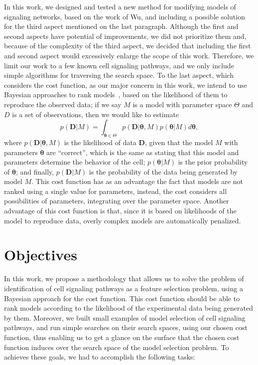 In this work, we designed and tested a new method for modifying 
models of signaling networks, based on the work of Wu, and including 
a possible solution for the third aspect mentioned on the last 
paragraph. Although the first and second aspects have potential of 
improvements, we did not prioritize them and, because of the 
complexity of the third aspect, we decided that including the first and 
second aspect would excessively enlarge the scope of this work.
Therefore, we limit our work to a few known cell signaling pathways, and
we only include simple algorithms for traversing the search space. To
the last aspect, which considers the cost function, as our major 
concern in this work, we intend to use Bayesian approaches to rank 
models~\cite{Vyshemirsky2007}, based on the likelihood of them to 
reproduce the observed data; if we say $M$ is a model with parameter 
space $\Theta$ and $D$ is a set of observations, then we would like to 
estimate 
\begin{equation*}
    p ({\bm D}|M) = \int_{{\bm \theta} \in \Theta} p ({\bm D} | {\bm
    \theta}, M)p({\bm \theta} | M)d{\bm \theta}, 
\end{equation*}
where $p ({\bm D}|{\bm \theta}, M)$ is the likelihood of data ${\bm D}$,
given that the model $M$ with parameters ${\bm \theta}$ are ``correct'',
which is the same as stating that this model and parameters determine
the behavior of the cell; $p({\bm \theta} | M)$ is the prior
probability of ${\bm \theta}$; and finally, $p ({\bm D} | M)$ is the
probability of the data being generated by model $M$. This cost function
has as an advantage the fact that models are not ranked using a single
value for parameters, instead, the cost considers all possibilities of
parameters, integrating over the parameter space. Another advantage of
this cost function is that, since it is based on likelihoods of the
model to reproduce data, overly complex models are automatically
penalized.

\section{Objectives}
In this work, we propose a methodology that allows us 
to solve the problem of identification of cell signaling pathways as a 
feature selection problem, using a Bayesian approach for the cost
function. This cost function should be able to rank models according to
the likelihood of the experimental data being generated by them. Moreover,
we built small examples of model selection of cell signaling pathways, and
run simple searches on their search spaces, using our chosen cost 
function, thus enabling us to get a glance on the
surface that the chosen cost function induces over the search space of
the model selection problem. To achieves these goals, we had to
accomplish the following tasks:

